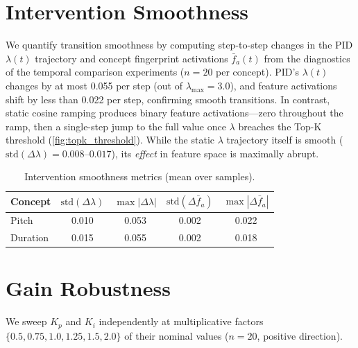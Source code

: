 \documentclass{article}
\theoremstyle{plain}
\begin{document}
\section{Intervention Smoothness}
\label{app:smoothness}

We quantify transition smoothness by computing step-to-step changes in the PID $\lambda(t)$ trajectory and concept fingerprint activations $\bar{f}_a(t)$ from the diagnostics of the temporal comparison experiments ($n{=}20$ per concept). PID's $\lambda(t)$ changes by at most 0.055 per step (out of $\lambda_\text{max}{=}3.0$), and feature activations shift by less than 0.022 per step, confirming smooth transitions. In contrast, static cosine ramping produces binary feature activations---zero throughout the ramp, then a single-step jump to the full value once $\lambda$ breaches the Top-K threshold (\cref{fig:topk_threshold}). While the static $\lambda$ trajectory itself is smooth ($\text{std}(\Delta\lambda){=}0.008$--$0.017$), its \emph{effect} in feature space is maximally abrupt.

\begin{table}[h]
  \caption{Intervention smoothness metrics (mean over samples).}
  \label{tab:smoothness}
  \begin{center}
  \begin{small}
  \begin{tabular}{lcccc}
    \toprule
    Concept & $\text{std}(\Delta\lambda)$ & $\max|\Delta\lambda|$ & $\text{std}(\Delta\bar{f}_a)$ & $\max|\Delta\bar{f}_a|$ \\
    \midrule
    Pitch & 0.010 & 0.053 & 0.002 & 0.022 \\
    Duration & 0.015 & 0.055 & 0.002 & 0.018 \\
    \bottomrule
  \end{tabular}
  \end{small}
  \end{center}
\end{table}



\section{Gain Robustness}
\label{app:gain_robustness}

We sweep $K_p$ and $K_i$ independently at multiplicative factors $\{0.5, 0.75, 1.0, 1.25, 1.5, 2.0\}$ of their nominal values ($n{=}20$, positive direction).
\end{document}
